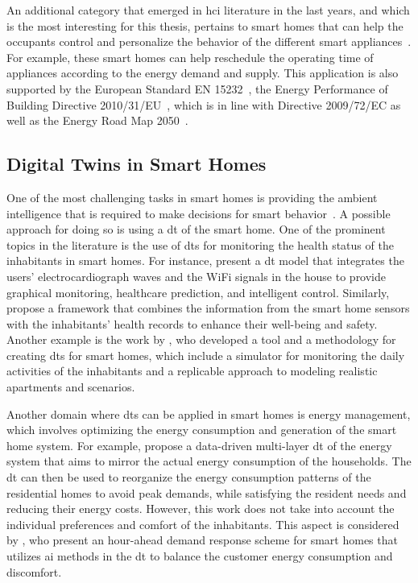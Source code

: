 An additional category that emerged in \acrfull{hci} literature in the last years, and which is the most interesting for this thesis, pertains to smart homes that can help the occupants control and personalize the behavior of the different smart appliances~\parencite{desilvaStateArtSmart2012,lobaccaroReviewSystemsTechnologies2016}. For example, these smart homes can help reschedule the operating time of appliances according to the energy demand and supply. This application is also supported by the European Standard EN 15232~\parencite{comiteeuropeendenormalisationEnergyPerformanceBuildings2012}, the Energy Performance of Building Directive 2010/31/EU~\parencite{europeanparliamentDirectiveEU20182018}, which is in line with Directive 2009/72/EC as well as the Energy Road Map 2050~\parencite{europeanclimatefoundationEnergyRoadmap20502011}.

\subsection{Digital Twins in Smart Homes}

One of the most challenging tasks in smart homes is providing the ambient intelligence that
is required to make decisions for smart behavior~\parencite{desilvaStateArtSmart2012}. A possible approach for doing so is using a \acrshort{dt} of the smart home. One of the prominent topics in the literature is the use of \acrshort{dt}s for monitoring the health status of the inhabitants in smart homes. For instance, \textcite{chenDigitalTwinEmpowered2023} present a \acrshort{dt} model that integrates the users' electrocardiograph waves and the WiFi signals in the house to provide graphical monitoring, healthcare prediction, and intelligent control. Similarly, \textcite{shoukatSmartHomeEnhanced2023} propose a framework that combines the information from the smart home sensors with the inhabitants' health records to enhance their well-being and safety. Another example is the work by \textcite{bouchabouSmartHomeDigital2023}, who developed a tool and a methodology for creating \acrshort{dt}s for smart homes, which include a simulator for monitoring the daily activities of the inhabitants and a replicable approach to modeling realistic apartments and scenarios.

Another domain where \acrshort{dt}s can be applied in smart homes is energy management, which involves optimizing the energy consumption and generation of the smart home system. For example, \textcite{fathyDigitalTwinDrivenDecision2021} propose a data-driven multi-layer \acrshort{dt} of the energy system that aims to mirror the actual energy consumption of the households. The \acrshort{dt} can then be used to reorganize the energy consumption patterns of the residential homes to avoid peak demands, while satisfying the resident needs and reducing their energy costs. However, this work does not take into account the individual preferences and comfort of the inhabitants. This aspect is considered by \textcite{huangMachineLearningbasedDemand2023}, who present an hour-ahead demand response scheme for smart homes that utilizes \acrshort{ai} methods in the \acrshort{dt} to balance the customer energy consumption and discomfort.

